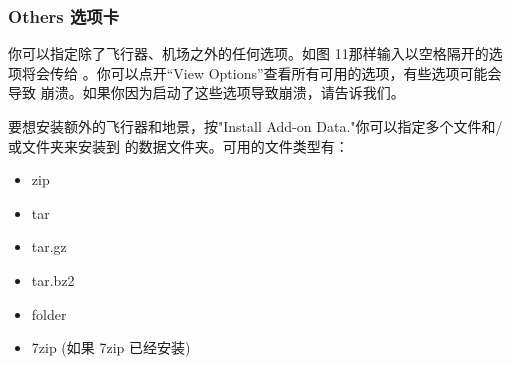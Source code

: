 \ifchinese
\subsubsection{Others 选项卡}
你可以指定除了飞行器、机场之外的任何选项。如图 11那样输入以空格隔开的选项将会传给 \FlightGear{}。你可以点开“View Options”查看所有可用的选项，有些选项可能会导致 \FlightGear{} 崩溃。如果你因为启动了这些选项导致崩溃，请告诉我们。

要想安装额外的飞行器和地景，按"Install Add-on Data."你可以指定多个文件和/或文件夹来安装到 \FlightGear{} 的数据文件夹。可用的文件类型有：
\begin{itemize}
\item zip
\item tar
\item tar.gz
\item tar.bz2
\item folder
\item 7zip (如果 7zip 已经安装)
\end{itemize}

